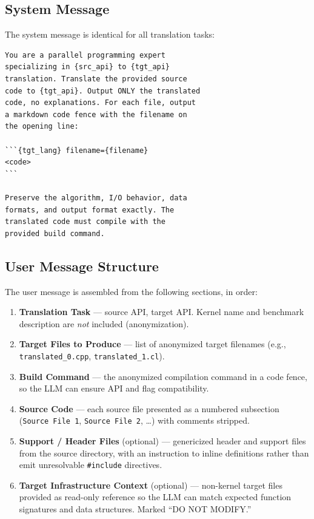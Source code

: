 \subsection{System Message}

The system message is identical for all translation tasks:

\begin{lstlisting}[language={},caption={System message template. \texttt{\{src\_api\}} and \texttt{\{tgt\_api\}} are replaced with API display names (e.g., ``CUDA'', ``OpenMP''). \texttt{\{tgt\_lang\}} is the target language hint (e.g., ``cpp'', ``c'').},label={lst:system-msg}]
You are a parallel programming expert
specializing in {src_api} to {tgt_api}
translation. Translate the provided source
code to {tgt_api}. Output ONLY the translated
code, no explanations. For each file, output
a markdown code fence with the filename on
the opening line:

```{tgt_lang} filename={filename}
<code>
```

Preserve the algorithm, I/O behavior, data
formats, and output format exactly. The
translated code must compile with the
provided build command.
\end{lstlisting}

\subsection{User Message Structure}

The user message is assembled from the following sections, in order:

\begin{enumerate}
\item \textbf{Translation Task} --- source API, target API. Kernel name and
  benchmark description are \emph{not} included (anonymization).
\item \textbf{Target Files to Produce} --- list of anonymized target filenames
  (e.g., \texttt{translated\_0.cpp}, \texttt{translated\_1.cl}).
\item \textbf{Build Command} --- the anonymized compilation command in a code
  fence, so the LLM can ensure API and flag compatibility.
\item \textbf{Source Code} --- each source file presented as a numbered
  subsection (\texttt{Source File 1}, \texttt{Source File 2}, \ldots) with
  comments stripped.
\item \textbf{Support / Header Files} (optional) --- genericized header and
  support files from the source directory, with an instruction to inline
  definitions rather than emit unresolvable \texttt{\#include} directives.
\item \textbf{Target Infrastructure Context} (optional) --- non-kernel target
  files provided as read-only reference so the LLM can match expected function
  signatures and data structures. Marked ``DO NOT MODIFY.''
\end{enumerate}

